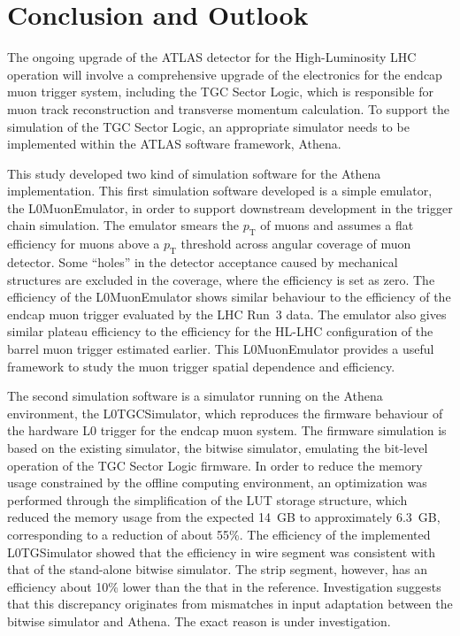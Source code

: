 \chapter{Conclusion and Outlook} \label{ch:conclusion}
The ongoing upgrade of the ATLAS detector for the High-Luminosity LHC operation will involve a comprehensive upgrade of the electronics for the endcap muon trigger system, including the TGC Sector Logic, which is responsible for muon track reconstruction and transverse momentum calculation. To support the simulation of the TGC Sector Logic, an appropriate simulator needs to be implemented within the ATLAS software framework, Athena.

This study developed two kind of simulation software for the Athena implementation. This first simulation software developed is a simple emulator, the L0MuonEmulator, in order to support downstream development in the trigger chain simulation. The emulator smears the $p_{\mathrm{T}}$ of muons and assumes a flat efficiency for muons above a $p_{\mathrm{T}}$ threshold across angular coverage of muon detector. Some ``holes'' in the detector acceptance caused by mechanical structures are excluded in the coverage, where the efficiency is set as zero. The efficiency of the L0MuonEmulator shows similar behaviour to the efficiency of the endcap muon trigger evaluated by the LHC Run~3 data. The emulator also gives similar plateau efficiency to the efficiency for the HL-LHC configuration of the barrel muon trigger estimated earlier. This L0MuonEmulator provides a useful framework to study the muon trigger spatial dependence and efficiency.

The second simulation software is a simulator running on the Athena environment, the L0TGCSimulator, which reproduces the firmware behaviour of the hardware L0 trigger for the endcap muon system. The firmware simulation is based on the existing simulator, the bitwise simulator, emulating the bit-level operation of the TGC Sector Logic firmware. In order to reduce the memory usage constrained by the offline computing environment, an optimization was performed through the simplification of the LUT storage structure, which reduced the memory usage from the expected 14~GB to approximately 6.3~GB, corresponding to a reduction of about 55\%. The efficiency of the implemented L0TGSimulator showed that the efficiency in wire segment was consistent with that of the stand-alone bitwise simulator. The strip segment, however, has an efficiency about 10\% lower than the that in the reference. Investigation suggests that this discrepancy originates from mismatches in input adaptation between the bitwise simulator and Athena. The exact reason is under investigation.

